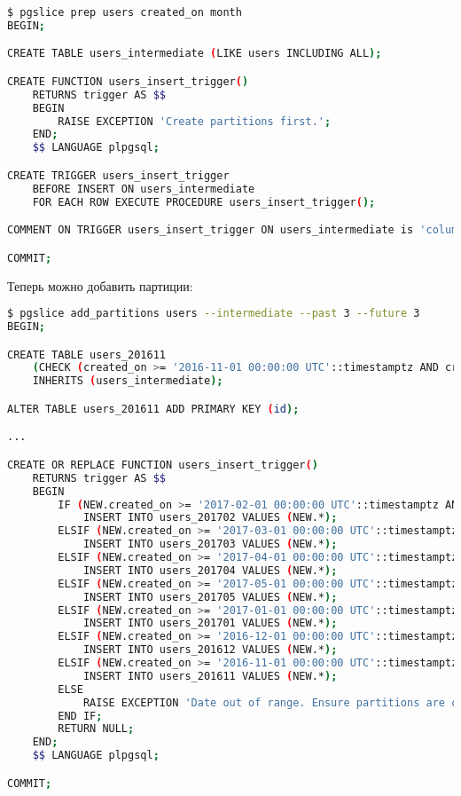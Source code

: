\begin{lstlisting}[language=Bash,label=lst:pgslice4,caption=Pgslice prep]
$ pgslice prep users created_on month
BEGIN;

CREATE TABLE users_intermediate (LIKE users INCLUDING ALL);

CREATE FUNCTION users_insert_trigger()
    RETURNS trigger AS $$
    BEGIN
        RAISE EXCEPTION 'Create partitions first.';
    END;
    $$ LANGUAGE plpgsql;

CREATE TRIGGER users_insert_trigger
    BEFORE INSERT ON users_intermediate
    FOR EACH ROW EXECUTE PROCEDURE users_insert_trigger();

COMMENT ON TRIGGER users_insert_trigger ON users_intermediate is 'column:created_on,period:month,cast:timestamptz';

COMMIT;
\end{lstlisting}

Теперь можно добавить партиции:

\begin{lstlisting}[language=Bash,label=lst:pgslice5,caption=Pgslice add\_partitions]
$ pgslice add_partitions users --intermediate --past 3 --future 3
BEGIN;

CREATE TABLE users_201611
    (CHECK (created_on >= '2016-11-01 00:00:00 UTC'::timestamptz AND created_on < '2016-12-01 00:00:00 UTC'::timestamptz))
    INHERITS (users_intermediate);

ALTER TABLE users_201611 ADD PRIMARY KEY (id);

...

CREATE OR REPLACE FUNCTION users_insert_trigger()
    RETURNS trigger AS $$
    BEGIN
        IF (NEW.created_on >= '2017-02-01 00:00:00 UTC'::timestamptz AND NEW.created_on < '2017-03-01 00:00:00 UTC'::timestamptz) THEN
            INSERT INTO users_201702 VALUES (NEW.*);
        ELSIF (NEW.created_on >= '2017-03-01 00:00:00 UTC'::timestamptz AND NEW.created_on < '2017-04-01 00:00:00 UTC'::timestamptz) THEN
            INSERT INTO users_201703 VALUES (NEW.*);
        ELSIF (NEW.created_on >= '2017-04-01 00:00:00 UTC'::timestamptz AND NEW.created_on < '2017-05-01 00:00:00 UTC'::timestamptz) THEN
            INSERT INTO users_201704 VALUES (NEW.*);
        ELSIF (NEW.created_on >= '2017-05-01 00:00:00 UTC'::timestamptz AND NEW.created_on < '2017-06-01 00:00:00 UTC'::timestamptz) THEN
            INSERT INTO users_201705 VALUES (NEW.*);
        ELSIF (NEW.created_on >= '2017-01-01 00:00:00 UTC'::timestamptz AND NEW.created_on < '2017-02-01 00:00:00 UTC'::timestamptz) THEN
            INSERT INTO users_201701 VALUES (NEW.*);
        ELSIF (NEW.created_on >= '2016-12-01 00:00:00 UTC'::timestamptz AND NEW.created_on < '2017-01-01 00:00:00 UTC'::timestamptz) THEN
            INSERT INTO users_201612 VALUES (NEW.*);
        ELSIF (NEW.created_on >= '2016-11-01 00:00:00 UTC'::timestamptz AND NEW.created_on < '2016-12-01 00:00:00 UTC'::timestamptz) THEN
            INSERT INTO users_201611 VALUES (NEW.*);
        ELSE
            RAISE EXCEPTION 'Date out of range. Ensure partitions are created.';
        END IF;
        RETURN NULL;
    END;
    $$ LANGUAGE plpgsql;

COMMIT;
\end{lstlisting}

